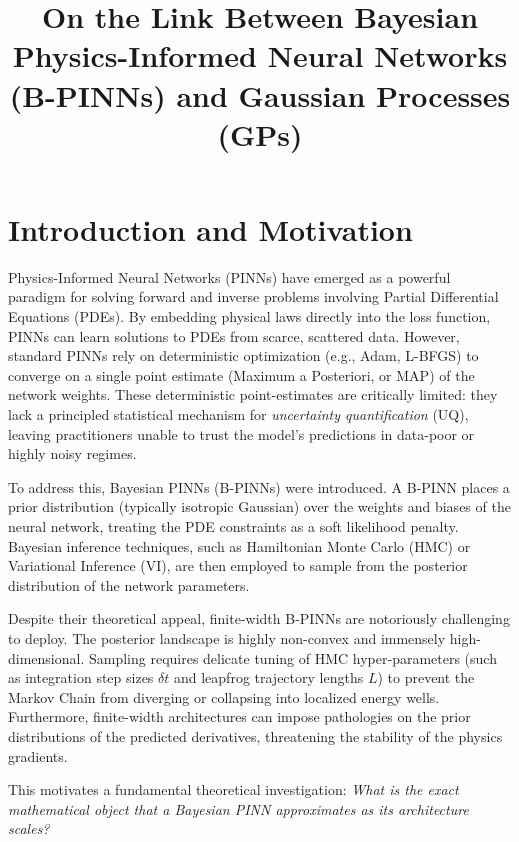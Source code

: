 \documentclass[11pt]{article}
\title{On the Link Between Bayesian Physics-Informed Neural Networks (B-PINNs) and Gaussian Processes (GPs)}
\author{}
\date{}
\begin{document}
\maketitle

\section{Introduction and Motivation}
Physics-Informed Neural Networks (PINNs) have emerged as a powerful paradigm for solving forward and inverse problems involving Partial Differential Equations (PDEs). By embedding physical laws directly into the loss function, PINNs can learn solutions to PDEs from scarce, scattered data. However, standard PINNs rely on deterministic optimization (e.g., Adam, L-BFGS) to converge on a single point estimate (Maximum a Posteriori, or MAP) of the network weights. These deterministic point-estimates are critically limited: they lack a principled statistical mechanism for \emph{uncertainty quantification} (UQ), leaving practitioners unable to trust the model's predictions in data-poor or highly noisy regimes.

To address this, Bayesian PINNs (B-PINNs) were introduced. A B-PINN places a prior distribution (typically isotropic Gaussian) over the weights and biases of the neural network, treating the PDE constraints as a soft likelihood penalty. Bayesian inference techniques, such as Hamiltonian Monte Carlo (HMC) or Variational Inference (VI), are then employed to sample from the posterior distribution of the network parameters. 

Despite their theoretical appeal, finite-width B-PINNs are notoriously challenging to deploy. The posterior landscape is highly non-convex and immensely high-dimensional. Sampling requires delicate tuning of HMC hyper-parameters (such as integration step sizes $\delta t$ and leapfrog trajectory lengths $L$) to prevent the Markov Chain from diverging or collapsing into localized energy wells. Furthermore, finite-width architectures can impose pathologies on the prior distributions of the predicted derivatives, threatening the stability of the physics gradients.

This motivates a fundamental theoretical investigation: \emph{What is the exact mathematical object that a Bayesian PINN approximates as its architecture scales?}
\end{document}
